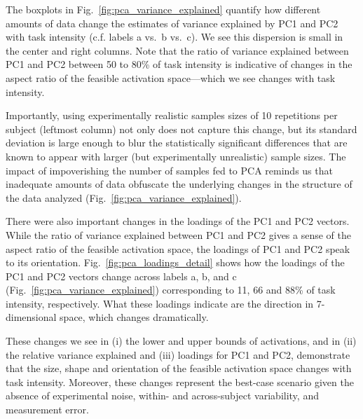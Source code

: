 \documentclass[9pt,twocolumn,twoside,lineno]{pnas-new}
\begin{document}
The boxplots in Fig.~\ref{fig:pca_variance_explained} quantify how different amounts of data change the estimates of variance explained by PC1 and PC2 with task intensity (c.f. labels a vs.\ b vs.\ c). We see this dispersion is small in the center and right columns.
Note that the ratio of variance explained between PC1 and PC2 between 50 to 80\% of task intensity is indicative of changes in the aspect ratio of the feasible activation space---which we see changes with task intensity.

Importantly, using experimentally realistic samples sizes of 10 repetitions per subject (leftmost column) not only does not capture this change, but its standard deviation is large enough to blur the statistically significant differences that are known to appear with larger (but experimentally unrealistic) sample sizes.
The impact of impoverishing the number of samples fed to PCA reminds us that inadequate amounts of data obfuscate the underlying changes in the structure of the data analyzed (Fig.~\ref{fig:pca_variance_explained}).

There were also important changes in the loadings of the PC1 and PC2 vectors. While the ratio of variance explained between PC1 and PC2 gives a sense of the aspect ratio of the feasible activation space, the loadings of PC1 and PC2 speak to its orientation.
Fig.~\ref{fig:pca_loadings_detail} shows how the loadings of the PC1 and PC2 vectors change across labels a, b, and c (Fig.~\ref{fig:pca_variance_explained}) corresponding to 11, 66 and 88\% of task intensity, respectively.
What these loadings indicate are the direction in 7-dimensional space, which changes dramatically.

These changes we see in (i) the lower and upper bounds of activations, and in (ii) the relative variance explained and (iii) loadings for PC1 and PC2, demonstrate that the size, shape and orientation of the feasible activation space changes with task intensity. Moreover, these changes represent the best-case scenario given the absence of experimental noise, within- and across-subject variability, and measurement error.
\end{document}
